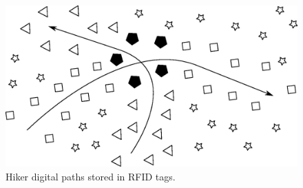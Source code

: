 \begin{figure}
\centering
\includegraphics[width=5in]{Chapter_2_Figures/hiker_paths.eps}
\caption{Hiker digital paths stored in RFID tags.}
\label{Figure: hiker_paths.eps}
\end{figure}
\clearpage

